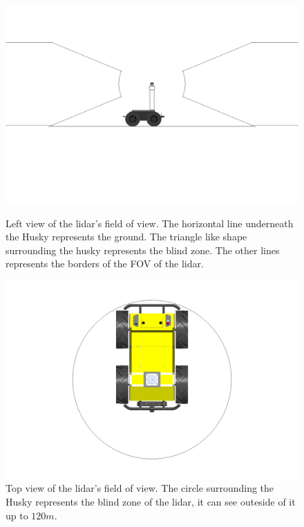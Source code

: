 \begin{figure}[H]
    \centering
    \begin{minipage}[b]{0.49\textwidth}
        \includegraphics[width=\textwidth]{Figures/CAD/FOV/lidarFovLeftSketchLimited.PNG}
        \caption{Left view of the lidar's field of view. The horizontal line underneath the Husky represents the ground. The triangle like shape surrounding the husky represents the blind zone. The other lines represents the borders of the FOV of the lidar.}
        \label{fig:lidarFovLeftSketchLimited}
    \end{minipage}
    \begin{minipage}[b]{0.49\textwidth}
        \includegraphics[width=\textwidth]{Figures/CAD/FOV/lidarFovTopSketch.PNG}
        \caption{Top view of the lidar's field of view. The circle surrounding the Husky represents the blind zone of the lidar, it can see outeside of it up to $120 m$.}
        \label{fig:lidarFovTopSketch}
    \end{minipage}
\end{figure}
